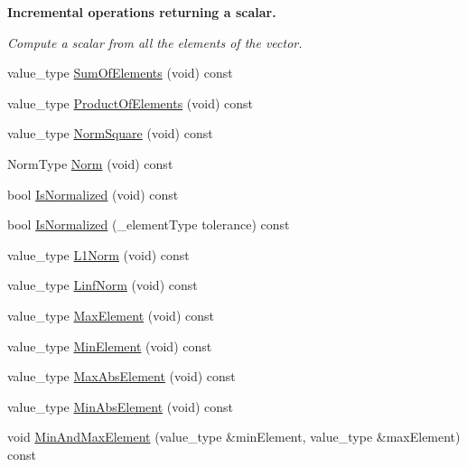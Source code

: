 \begin{Indent}{\bf Incremental operations returning a scalar.}\par
{\em Compute a scalar from all the elements of the vector. }\begin{DoxyCompactItemize}
\item 
value\+\_\+type \hyperlink{classvct_dynamic_const_vector_base_a8a06cb87f0416634404a756b08884d65}{Sum\+Of\+Elements} (void) const 
\item 
value\+\_\+type \hyperlink{classvct_dynamic_const_vector_base_a6b7a5255aa05d0037f5b1537a5ff9633}{Product\+Of\+Elements} (void) const 
\item 
value\+\_\+type \hyperlink{classvct_dynamic_const_vector_base_a4beba8c7aca463ad309b247751feac47}{Norm\+Square} (void) const 
\item 
Norm\+Type \hyperlink{classvct_dynamic_const_vector_base_ab3f2a857534d2efd65b7b2a02f6d7a89}{Norm} (void) const 
\item 
bool \hyperlink{classvct_dynamic_const_vector_base_a826dfe65ac82e97d608eb8ddf06757da}{Is\+Normalized} (void) const 
\item 
bool \hyperlink{classvct_dynamic_const_vector_base_adacfbde73572750f96c9adaf9b631d51}{Is\+Normalized} (\+\_\+element\+Type tolerance) const 
\item 
value\+\_\+type \hyperlink{classvct_dynamic_const_vector_base_a0af436d0aeea56d44e6b242be1639959}{L1\+Norm} (void) const 
\item 
value\+\_\+type \hyperlink{classvct_dynamic_const_vector_base_a34e41ecfe2adfbfe14c66c925cac3c1b}{Linf\+Norm} (void) const 
\item 
value\+\_\+type \hyperlink{classvct_dynamic_const_vector_base_ae909aabd2f49189f0a4a711eab0daeac}{Max\+Element} (void) const 
\item 
value\+\_\+type \hyperlink{classvct_dynamic_const_vector_base_aefff21217e21e08394c56290361612bf}{Min\+Element} (void) const 
\item 
value\+\_\+type \hyperlink{classvct_dynamic_const_vector_base_a038efc5bac847da3c24ac3f8e6e21826}{Max\+Abs\+Element} (void) const 
\item 
value\+\_\+type \hyperlink{classvct_dynamic_const_vector_base_a789ec4b2308dff10c7c5d464f4b0647c}{Min\+Abs\+Element} (void) const 
\item 
void \hyperlink{classvct_dynamic_const_vector_base_ace535a9eb14e3809f875e295946634a0}{Min\+And\+Max\+Element} (value\+\_\+type \&min\+Element, value\+\_\+type \&max\+Element) const 
\item 

\end{DoxyCompactItemize}
\end{Indent}
